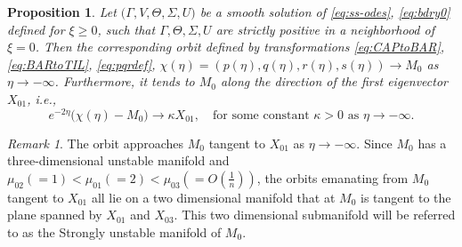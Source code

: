 \documentclass[usletter,11pt]{article}
\def\BO{{{O}}}
\newtheorem{proposition}{Proposition}[section]
\theoremstyle{remark}
\newtheorem{remark}{Remark}[section]
\begin{document}
\begin{proposition} \label{prop1}
    Let $\big(\Gamma,V,\Theta,\Sigma,U\big)$ be a smooth solution of \eqref{eq:ss-odes}, \eqref{eq:bdry0} defined for $\xi\ge0$, such that
    $\Gamma, \Theta, \Sigma, U $ are strictly positive in a neighborhood of $\xi = 0$. Then the corresponding orbit defined by transformations \eqref{eq:CAPtoBAR}, 
    \eqref{eq:BARtoTIL},  \eqref{eq:pqrdef}, $\chi(\eta) = (p(\eta), q(\eta), r(\eta),s(\eta)) \rightarrow M_0$ as $\eta \rightarrow -\infty$. 
    Furthermore, it tends to $M_0$ along the direction of the first eigenvector $X_{01}$, i.e.,
    \begin{equation} \label{eq:alpha}
     e^{-2\eta}\big(\chi(\eta) - M_0 \big) \rightarrow \kappa X_{01}, \quad \text{for some constant  $\kappa>0$ as $\eta \rightarrow -\infty$.}
    \end{equation}
\end{proposition}

\begin{remark} \label{rem:alpha}
The orbit approaches $M_0$ tangent to $X_{01}$ as $\eta \rightarrow -\infty$. Since $M_0$ has a three-dimensional unstable manifold and $\mu_{02}(=1)<\mu_{01}(=2)<\mu_{03}(=\BO(\frac{1}{n}))$, %
  the orbits emanating from $M_0$ tangent to $X_{01}$ all lie on a two dimensional manifold that at $M_0$ is tangent to the plane spanned by $X_{01}$ and $X_{03}$. This two dimensional submanifold will be referred to as the Strongly unstable manifold of $M_0$.
\end{remark}
\end{document}
